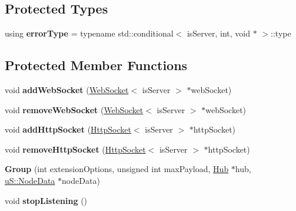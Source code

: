 \subsection*{Protected Types}
\begin{DoxyCompactItemize}
\item 
\mbox{\label{structu_w_s_1_1_group_a769dd13448095ac42a252737599c704c}} 
using {\bfseries error\+Type} = typename std\+::conditional$<$ is\+Server, int, void $\ast$ $>$\+::type
\end{DoxyCompactItemize}
\subsection*{Protected Member Functions}
\begin{DoxyCompactItemize}
\item 
\mbox{\label{structu_w_s_1_1_group_a0514bb0ad4109cf3083e4a367a17dc70}} 
void {\bfseries add\+Web\+Socket} (\mbox{\hyperlink{structu_w_s_1_1_web_socket}{Web\+Socket}}$<$ is\+Server $>$ $\ast$web\+Socket)
\item 
\mbox{\label{structu_w_s_1_1_group_a32b010b119449200a83de144a7876bd0}} 
void {\bfseries remove\+Web\+Socket} (\mbox{\hyperlink{structu_w_s_1_1_web_socket}{Web\+Socket}}$<$ is\+Server $>$ $\ast$web\+Socket)
\item 
\mbox{\label{structu_w_s_1_1_group_a8be2b7124e204b7aab906f752314ed24}} 
void {\bfseries add\+Http\+Socket} (\mbox{\hyperlink{structu_w_s_1_1_http_socket}{Http\+Socket}}$<$ is\+Server $>$ $\ast$http\+Socket)
\item 
\mbox{\label{structu_w_s_1_1_group_a2aaaf4a3d6de5c13f8536359a035b8f7}} 
void {\bfseries remove\+Http\+Socket} (\mbox{\hyperlink{structu_w_s_1_1_http_socket}{Http\+Socket}}$<$ is\+Server $>$ $\ast$http\+Socket)
\item 
\mbox{\label{structu_w_s_1_1_group_ae24681cc78d51959aa8cd3fa78c3d0db}} 
{\bfseries Group} (int extension\+Options, unsigned int max\+Payload, \mbox{\hyperlink{structu_w_s_1_1_hub}{Hub}} $\ast$hub, \mbox{\hyperlink{structu_s_1_1_node_data}{u\+S\+::\+Node\+Data}} $\ast$node\+Data)
\item 
\mbox{\label{structu_w_s_1_1_group_adfb0a9529a99460c943f88a7f67cfb3a}} 
void {\bfseries stop\+Listening} ()
\end{DoxyCompactItemize}

